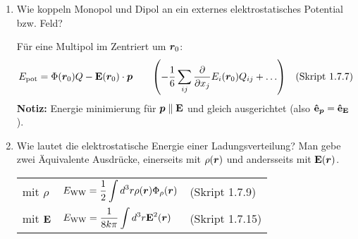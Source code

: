 \begin{enumerate}
  \item Wie koppeln Monopol und Dipol an ein externes elektrostatisches
        Potential bzw. Feld?
        
        Für eine Multipol im Zentriert um $\vb* r_0$:
        $$E_{\text{pot}}=\Phi(\vb* r_0)Q-\vb E(\vb* r_0)\cdot\vb* p 
        \qquad\qty(-\frac{1}{6}\sum_{ij}\pdv{x_j}E_i(\vb* r_0)Q_{ij}
        +\ldots)
        \quad\text{(Skript 1.7.7)}$$
        \textbf{Notiz:} Energie minimierung für $\vb* p\parallel \vb E$
        und gleich ausgerichtet (also $\vu e_{\vb* p}=\vu e_{\vb E}$).\\

  \clearpage
  \item Wie lautet die elektrostatische Energie einer Ladungsverteilung?
        Man gebe zwei Äquivalente Ausdrücke, einerseits mit $\rho(\vb* r)$
        und andersseits mit $\vb E(\vb* r)$.
        \begin{center}
        \begin{tabular}{lll}
          mit $\rho$    & $\displaystyle E_{\text{WW}}=
                          \frac{1}{2}\int d^3 r\rho(\vb* r)
                          \Phi_\rho(\vb* r)$
                            &(Skript 1.7.9)\\
          mit $\vb E$   & $\displaystyle E_{\text{WW}}=\frac{1}{8k\pi}
                           \int d^3 r\vb E^2(\vb* r)$
                            &(Skript 1.7.15)\\
        \end{tabular}
        \end{center}


\end{enumerate}
